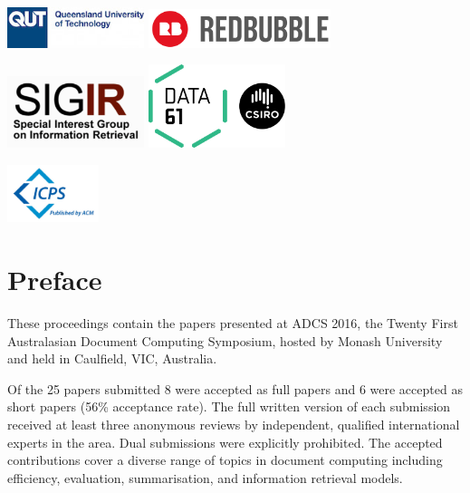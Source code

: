 \documentclass[a4paper]{article}
\begin{document}
\begin{center}
\includegraphics[width=0.3\textwidth]{qut_logo_2lines.jpg} \hspace{4em}
\includegraphics[width=0.4\textwidth]{redbubble.png} 


\vspace{1em}

\includegraphics[width=0.3\textwidth]{sigir-logo.png} \hspace{4em}
\includegraphics[width=0.3\textwidth]{csiro-logo}
\end{center}

\vspace{1in}

\hfill\includegraphics[width=0.2\textwidth]{icps-logo}

\newpage

\section*{Preface}

These proceedings contain the papers presented at ADCS 2016, the Twenty First 
Australasian Document Computing Symposium, hosted by Monash University
and held in Caulfield, VIC, Australia.

Of the 25 papers submitted 8 were accepted as full papers and 6 were accepted
as short papers (56\% acceptance rate).  The  full  written  version  of each submission received at
least three anonymous reviews by independent, qualified international experts
in the area. Dual submissions were explicitly prohibited.  The accepted
contributions cover a diverse range of topics in document computing including
efficiency, evaluation, summarisation, and information retrieval
models.
\end{document}
